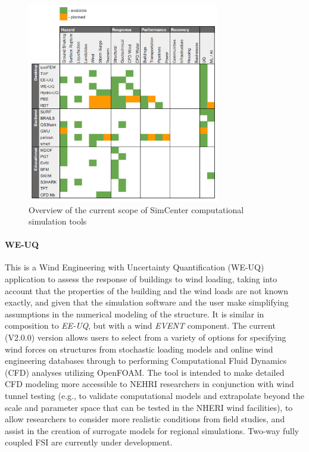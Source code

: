 \begin{figure}[htb]
    \centering
    \includegraphics[width=0.75\textwidth, angle = 0]{Figures/tool_overview.png}
    \caption{Overview of the current scope of SimCenter computational simulation tools}
    \label{fig:intro_tool_overview}
\end{figure}

\paragraph{WE-UQ} This is a Wind Engineering with Uncertainty Quantification (WE-UQ) application to assess the response of buildings to wind loading, taking into account that the properties of the building and the wind loads are not known exactly, and given that the simulation software and the user make simplifying assumptions in the numerical modeling of the structure. It is similar in composition to \emph{EE-UQ}, but with a wind \emph{EVENT} component.  The current (V2.0.0) version allows users to select from a variety of options for specifying wind forces on structures from stochastic loading models and online wind engineering databases through to performing Computational Fluid Dynamics (CFD) analyses utilizing OpenFOAM. The tool is intended to make detailed CFD modeling more accessible to NEHRI researchers in conjunction with wind tunnel testing (e.g., to validate computational models and extrapolate beyond the scale and parameter space that can be tested in the NHERI wind facilities), to allow researchers to consider more realistic conditions from field studies, and assist in the creation of surrogate models for regional simulations. Two-way fully coupled FSI are currently under development.


